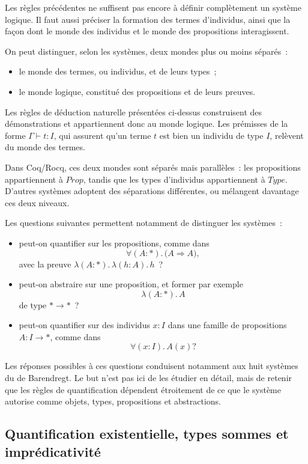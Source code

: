 \thingy
Les règles précédentes ne suffisent pas encore à définir complètement
un système logique.  Il faut aussi préciser la formation des termes
d'individus, ainsi que la façon dont le monde des individus et le monde
des propositions interagissent.

On peut distinguer, selon les systèmes, deux mondes plus ou moins
séparés :
\begin{itemize}
\item le monde des termes, ou individus, et de leurs types ;
\item le monde logique, constitué des propositions et de leurs preuves.
\end{itemize}
Les règles de déduction naturelle présentées ci-dessus construisent des
démonstrations et appartiennent donc au monde logique.  Les prémisses de
la forme $\Gamma\vdash t:I$, qui assurent qu'un terme $t$ est bien un
individu de type $I$, relèvent du monde des termes.

\thingy
Dans Coq/Rocq, ces deux mondes sont séparés mais parallèles : les
propositions appartiennent à $\mathit{Prop}$, tandis que les types
d'individus appartiennent à $\mathit{Type}$.  D'autres systèmes adoptent
des séparations différentes, ou mélangent davantage ces deux niveaux.

Les questions suivantes permettent notamment de distinguer les
systèmes :
\begin{itemize}
\item peut-on quantifier sur les propositions, comme dans
  \[
  \forall(A:*).\,\bigl(A\Rightarrow A\bigr),
  \]
  avec la preuve
  $\lambda(A:*).\,\lambda(h:A).\,h$ ?
\item peut-on abstraire sur une proposition, et former par exemple
  \[
  \lambda(A:*).\,A
  \]
  de type $*\rightarrow *$ ?
\item peut-on quantifier sur des individus $x:I$ dans une famille de
  propositions $A:I\rightarrow *$, comme dans
  \[
  \forall(x:I).\,A(x)?
  \]
\end{itemize}

\thingy
Les réponses possibles à ces questions conduisent notamment aux huit
systèmes du  de Barendregt.  Le but n'est pas ici
de les étudier en détail, mais de retenir que les règles de quantification
dépendent étroitement de ce que le système autorise comme objets, types,
propositions et abstractions.

\subsection{Quantification existentielle, types sommes et
imprédicativité}

